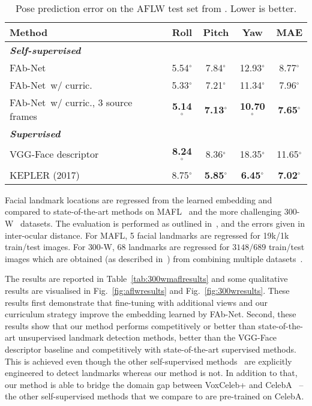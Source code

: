 \documentclass{bmvc2k}
\newcommand{\figref}[1]{Fig.~\ref{#1}}
\def\networkname{FAb-Net}
\begin{document}
\begin{table}
\begin{minipage}{0.43\linewidth}
\begin{tabular}{ | p{1.6cm} | c | c | c| c|}
{\bf Method} &  {\bf Roll}&  {\bf Pitch} & {\bf Yaw} & {\bf MAE}\\ \hline 
{\textit{\textbf{Self-supervised}}} & & & & \\
\networkname~ & {{5.54}}$^{\circ}$ & {7.84}$^{\circ}$ & {12.93}$^{\circ}$ & {8.77}$^{\circ}$\\ 
\networkname~w/ curric. & {{5.33}}$^{\circ}$ & {7.21}$^{\circ}$ & {11.34}$^{\circ}$ & {7.96}$^{\circ}$\\ 
\networkname~w/ curric., 3 source frames & {\bf{5.14}}$^{\circ}$ & {\bf 7.13}$^{\circ}$ & {\bf 10.70}$^{\circ}$ & {\bf 7.65}$^{\circ}$\\ \hline \hline
{\textit{\textbf{Supervised}}} & & & & \\
VGG-Face descriptor~\cite{Parkhi15} & {\bf 8.24}$^{\circ}$  & {8.36}$^{\circ}$ & {18.35}$^{\circ}$ & {11.65}$^{\circ}$ \\
KEPLER \cite{Kumar17} (2017) & {8.75}$^{\circ}$  & {\bf 5.85}$^{\circ}$ & {\bf 6.45}$^{\circ}$ & {\bf{7.02}}$^{\circ}$ \\ \hline
\end{tabular}
\caption{Pose prediction error on the AFLW test set from \cite{Kumar17}. Lower is better.}	
\label{tab:poseresults}
\end{minipage}

\end{table}
Facial landmark locations are regressed from the learned embedding and compared to state-of-the-art methods on MAFL~\cite{Zhang16} and the more challenging $300$-W~\cite{sagonas2016300} datasets.
The evaluation is performed as outlined in~\cite{Zhang16,Thewlis17a}, and the errors given in inter-ocular distance. 
For MAFL, 5 facial landmarks are regressed for 19k/1k train/test images. 
For $300$-W, $68$ landmarks are regressed for $3148/689$ train/test images which are obtained (as described in~\cite{Thewlis17a}) from combining multiple datasets~\cite{zhu12facewild,Belhumeur13,Zhou13workshops}.

The results are reported in Table~\ref{tab:300wmaflresults} and some qualitative results are visualised in \figref{fig:aflwresults} and \figref{fig:300wresults}. 
These results first demonstrate that fine-tuning with additional views and our curriculum strategy improve the embedding learned by \networkname.
Second, these results show that our method performs competitively or better than state-of-the-art unsupervised landmark detection methods, better than the VGG-Face descriptor baseline and competitively with state-of-the-art supervised methods.
This is achieved even though the other self-supervised methods~\cite{zhang2018unsupervised,Thewlis17a,Thewlis17b,jakab2018conditional} are explicitly engineered to detect landmarks whereas our method is not. In addition to that, our method is able to bridge the domain gap between VoxCeleb+ and CelebA~\cite{liu2015faceattributes} -- the other self-supervised methods that we compare to are pre-trained on CelebA.
\end{document}
